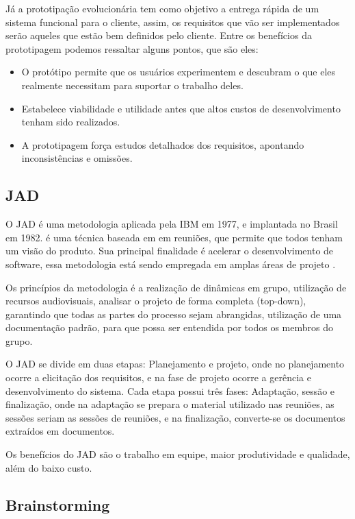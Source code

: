 Já a prototipação evolucionária tem como objetivo a entrega rápida de um sistema funcional para o cliente, assim, os requisitos que vão ser implementados serão aqueles que estão bem definidos pelo cliente.
Entre os benefícios da prototipagem podemos ressaltar alguns pontos, que são eles:

\begin{itemize}
\item O protótipo permite que os usuários experimentem e descubram o que eles realmente necessitam para suportar o trabalho deles.
\item Estabelece viabilidade e utilidade antes que altos custos de desenvolvimento tenham sido realizados.
\item A prototipagem força estudos detalhados dos requisitos, apontando inconsistências e omissões.
\end{itemize}

\subsection{JAD}

O JAD é uma metodologia aplicada pela IBM em 1977, e implantada no Brasil em 1982. é uma técnica baseada em em reuniões, que permite que todos tenham um visão do produto. Sua principal finalidade é acelerar o desenvolvimento de software, essa metodologia está sendo empregada em amplas áreas de projeto \cite {camila}.

Os princípios da metodologia é a realização de dinâmicas em grupo, utilização de recursos audiovisuais, analisar o projeto de forma completa (top-down), garantindo que todas as partes do processo sejam abrangidas, utilização de uma documentação padrão, para que possa ser entendida por todos os membros do grupo.

O JAD se divide em duas etapas: Planejamento e projeto, onde no planejamento ocorre a elicitação dos requisitos, e na fase de projeto ocorre a gerência e desenvolvimento do sistema. Cada etapa possui três fases: Adaptação, sessão e finalização, onde na adaptação se prepara o material utilizado nas reuniões, as sessões seriam as sessões de reuniões, e na finalização, converte-se os documentos extraídos em documentos.

Os benefícios do JAD são o trabalho em equipe, maior produtividade e qualidade, além do baixo custo.

\subsection{Brainstorming}

